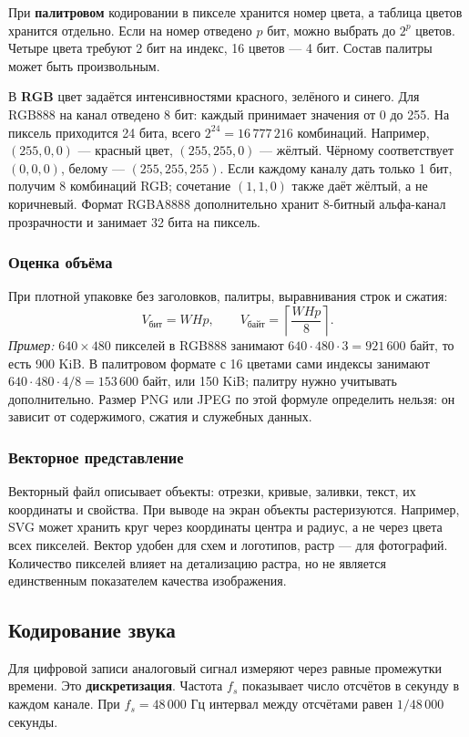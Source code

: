 При \textbf{палитровом} кодировании в пикселе хранится номер цвета,
а таблица цветов хранится отдельно. Если на номер отведено $p$ бит,
можно выбрать до $2^p$ цветов. Четыре цвета требуют 2 бит на индекс,
16 цветов --- 4 бит. Состав палитры может быть произвольным.

В \textbf{RGB} цвет задаётся интенсивностями красного, зелёного и синего.
Для RGB888 на канал отведено 8 бит: каждый принимает значения от 0 до 255.
На пиксель приходится 24 бита, всего $2^{24}=16\,777\,216$ комбинаций.
Например, $(255,0,0)$ --- красный цвет, $(255,255,0)$ --- жёлтый.
Чёрному соответствует $(0,0,0)$, белому --- $(255,255,255)$.
Если каждому каналу дать только 1 бит, получим 8 комбинаций RGB;
сочетание $(1,1,0)$ также даёт жёлтый, а не коричневый.
Формат RGBA8888 дополнительно хранит 8-битный альфа-канал прозрачности
и занимает 32 бита на пиксель.

\subsubsection*{Оценка объёма}
При плотной упаковке без заголовков, палитры, выравнивания строк и сжатия:
\[
V_{\text{бит}}=W H p,\qquad
V_{\text{байт}}=\left\lceil\frac{W H p}{8}\right\rceil.
\]
\textit{Пример:} $640\times480$ пикселей в RGB888 занимают
$640\cdot480\cdot3=921\,600$ байт, то есть 900 KiB.
В палитровом формате с 16 цветами сами индексы занимают
$640\cdot480\cdot4/8=153\,600$ байт, или 150 KiB;
палитру нужно учитывать дополнительно.
Размер PNG или JPEG по этой формуле определить нельзя: он зависит
от содержимого, сжатия и служебных данных.

\subsubsection*{Векторное представление}
Векторный файл описывает объекты: отрезки, кривые, заливки, текст,
их координаты и свойства. При выводе на экран объекты растеризуются.
Например, SVG может хранить круг через координаты центра и радиус,
а не через цвета всех пикселей. Вектор удобен для схем и логотипов,
растр --- для фотографий. Количество пикселей влияет на детализацию
растра, но не является единственным показателем качества изображения.

\subsection{Кодирование звука}
Для цифровой записи аналоговый сигнал измеряют через равные промежутки
времени. Это \textbf{дискретизация}. Частота $f_s$ показывает число
отсчётов в секунду в каждом канале. При $f_s=48\,000$ Гц интервал
между отсчётами равен $1/48\,000$ секунды.

